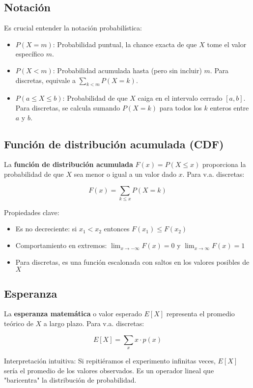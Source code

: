 \documentclass[letterpaper, 12pt]{article}
\begin{document}
	\subsection{Notación}
	Es crucial entender la notación probabilística:
	\begin{itemize}
		\item $P(X = m)$: Probabilidad puntual, la chance exacta de que $X$ tome el valor específico $m$.
		
		\item $P(X < m)$: Probabilidad acumulada hasta (pero sin incluir) $m$. Para discretas, equivale a $\sum_{k < m} P(X = k)$.
		
		\item $P(a \leq X \leq b)$: Probabilidad de que $X$ caiga en el intervalo cerrado $[a,b]$. Para discretas, se calcula sumando $P(X = k)$ para todos los $k$ enteros entre $a$ y $b$.
	\end{itemize}
	
	\subsection{Función de distribución acumulada (CDF)}
	La \textbf{función de distribución acumulada} $F(x) = P(X \leq x)$ proporciona la probabilidad de que $X$ sea menor o igual a un valor dado $x$. Para v.a. discretas:
	
	\[ F(x) = \sum_{k \leq x} P(X = k) \]
	
	Propiedades clave:
	\begin{itemize}
		\item Es no decreciente: si $x_1 < x_2$ entonces $F(x_1) \leq F(x_2)$
		\item Comportamiento en extremos: $\lim_{x\to-\infty} F(x) = 0$ y $\lim_{x\to\infty} F(x) = 1$
		\item Para discretas, es una función escalonada con saltos en los valores posibles de $X$
	\end{itemize}
	
	\subsection{Esperanza}
	La \textbf{esperanza matemática} o valor esperado $E[X]$ representa el promedio teórico de $X$ a largo plazo. Para v.a. discretas:
	
	\[ E[X] = \sum_x x \cdot p(x) \]
	
	Interpretación intuitiva: Si repitiéramos el experimento infinitas veces, $E[X]$ sería el promedio de los valores observados. Es un operador lineal que "baricentra" la distribución de probabilidad.
	
\end{document}
